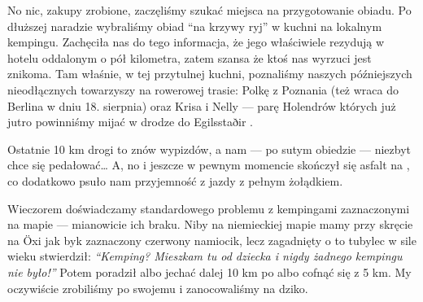 No nic, zakupy zrobione, zaczęliśmy szukać miejsca na przygotowanie obiadu. Po dłuższej naradzie wybraliśmy obiad “na krzywy ryj” w kuchni na lokalnym kempingu. Zachęciła nas do tego informacja, że jego właściwiele rezydują w hotelu oddalonym o pół kilometra, zatem szansa że ktoś nas wyrzuci jest znikoma. Tam właśnie, w tej przytulnej kuchni, poznaliśmy naszych późniejszych nieodłącznych towarzyszy na rowerowej trasie: Polkę z Poznania (też wraca do Berlina w dniu 18. sierpnia) oraz Krisa i Nelly --- parę Holendrów których już jutro powinniśmy mijać w drodze do Egilsstaðir .

Ostatnie 10 km drogi to znów wypizdów, a nam --- po sutym obiedzie --- niezbyt chce się pedałować… A, no i jeszcze w pewnym momencie skończył się asfalt na , co dodatkowo psuło nam przyjemność z jazdy z pełnym żołądkiem.


Wieczorem doświadczamy standardowego problemu z kempingami zaznaczonymi na mapie --- mianowicie ich braku. Niby na niemieckiej mapie mamy przy skręcie na Öxi jak byk zaznaczony czerwony namiocik, lecz zagadnięty o to tubylec w sile wieku stwierdził: \emph{“Kemping? Mieszkam tu od dziecka i nigdy żadnego kempingu nie było!”} Potem poradził albo jechać dalej 10 km po  albo cofnąć się z 5 km. My oczywiście zrobiliśmy po swojemu i zanocowaliśmy na dziko.